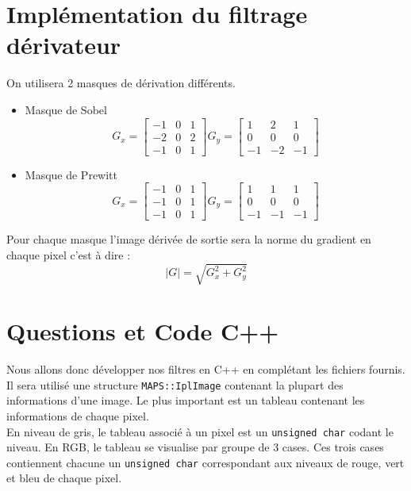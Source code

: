 \section{Implémentation du filtrage dérivateur}
On utilisera 2 masques de dérivation différents.
\begin{itemize}
	\item Masque de Sobel \\ \begin{equation}
			G_x=\begin{bmatrix}
					-1 & 0 & 1 \\
					-2 & 0 & 2 \\
					-1 & 0 & 1
				\end{bmatrix}
			G_y=\begin{bmatrix}
					1 & 2 & 1 \\
					0 & 0 & 0 \\
					-1 & -2 & -1
				\end{bmatrix}
		  \end{equation} 
    \item Masque de Prewitt \\ \begin{equation}
			G_x=\begin{bmatrix}
					-1 & 0 & 1 \\
					-1 & 0 & 1 \\
					-1 & 0 & 1
				\end{bmatrix}
			G_y=\begin{bmatrix}
					1 & 1 & 1 \\
					0 & 0 & 0 \\
					-1 & -1 & -1
				\end{bmatrix}
		  \end{equation} 
\end{itemize}
Pour chaque masque l'image dérivée de sortie sera la norme du gradient en chaque pixel c'est à dire :
\begin{equation}
|G| = \sqrt{G_x^2 + G_y^2}
\end{equation}

\section{Questions et Code C++}
Nous allons donc développer nos filtres en C++ en complétant les fichiers fournis. Il sera utilisé une structure \lstinline{MAPS::IplImage} contenant la plupart des informations d'une image. Le plus important est un tableau contenant les informations de chaque pixel.\\
En niveau de gris, le tableau associé à un pixel est un \lstinline{unsigned char} codant le niveau. En RGB, le tableau se visualise par groupe de 3 cases. Ces trois cases contiennent chacune un \lstinline{unsigned char} correspondant aux niveaux de rouge, vert et bleu de chaque pixel.

